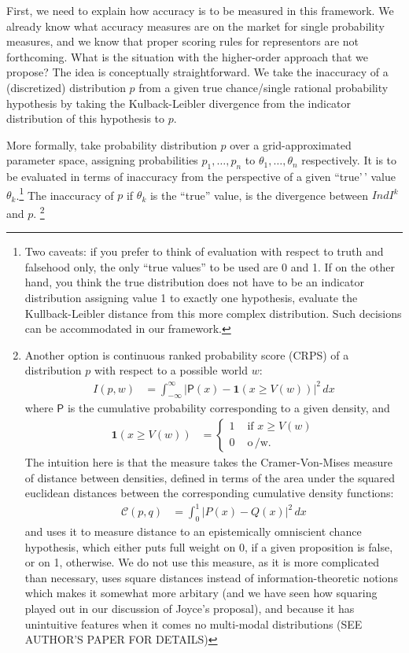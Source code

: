 \documentclass[
  10pt,
  dvipsnames,enabledeprecatedfontcommands]{scrartcl}
\begin{document}
First, we need to explain how accuracy is to be measured in this
framework. We already know what accuracy measures are on the market for
single probability measures, and we know that proper scoring rules for
representors are not forthcoming. What is the situation with the
higher-order approach that we propose? The idea is conceptually
straightforward. We take the inaccuracy of a (discretized) distribution
\(p\) from a given true chance/single rational probability hypothesis by
taking the Kulback-Leibler divergence from the indicator distribution of
this hypothesis to \(p\).

More formally, take probability distribution \(p\) over a
grid-approximated parameter space, assigning probabilities
\(p_1, \dots, p_n\) to \(\theta_1, \dots, \theta_n\) respectively. It is
to be evaluated in terms of inaccuracy from the perspective of a given
``true'\,' value \(\theta_k\).\footnote{Two caveats: if you prefer to
  think of evaluation with respect to truth and falsehood only, the only
  ``true values'' to be used are 0 and 1. If on the other hand, you
  think the true distribution does not have to be an indicator
  distribution assigning value 1 to exactly one hypothesis, evaluate the
  Kullback-Leibler distance from this more complex distribution. Such
  decisions can be accommodated in our framework.} The inaccuracy of
\(p\) if \(\theta_k\) is the ``true'' value, is the divergence between
\(IndI^k\) and \(p\). \footnote{Another option is continuous ranked
  probability score (CRPS) of a distribution \(p\) with respect to a
  possible world \(w\): \begin{align*}
  I(p,w) &= \int_{-\infty}^\infty \vert \mathsf{P}(x) - \mathbf{ 1 }(x\geq V(w))\vert ^2 \, dx
  \end{align*} \noindent where \(\mathsf{P}\) is the cumulative
  probability corresponding to a given density, and \begin{align*}
  \mathbf{ 1 }(x \geq V(w)) & = \begin{cases} 1 & \text{ if } x \geq V(w)\\
  0 & \text{ o$\,$/w. }
  \end{cases}
  \end{align*} \noindent  The intuition here is that the measure takes
  the Cramer-Von-Mises measure of distance between densities, defined in
  terms of the area under the squared euclidean distances between the
  corresponding cumulative density functions: \begin{align*}
  \mathcal{C}(p,q) & = \int_{0}^{1} \vert P(x) - Q(x)\vert^2 \, dx
  \end{align*} \noindent and uses it to measure distance to an
  epistemically omniscient chance hypothesis, which either puts full
  weight on 0, if a given proposition is false, or on 1, otherwise. We
  do not use this measure, as it is more complicated than necessary,
  uses square distances instead of information-theoretic notions which
  makes it somewhat more arbitary (and we have seen how squaring played
  out in our discussion of Joyce's proposal), and because it has
  unintuitive features when it comes no multi-modal distributions (SEE
  AUTHOR'S PAPER FOR DETAILS)}
\end{document}
